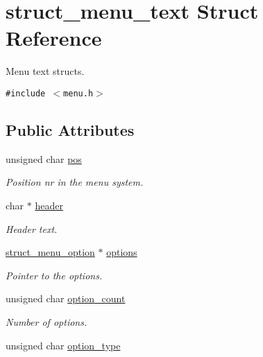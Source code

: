\hypertarget{structstruct__menu__text}{
\section{struct\_\-menu\_\-text Struct Reference}
\label{structstruct__menu__text}
}
Menu text structs.  


{\tt \#include $<$menu.h$>$}

\subsection*{Public Attributes}
\begin{CompactItemize}
\item 
\hypertarget{structstruct__menu__text_3cb34433f86c24879ebdd1bbca6b3fea}{
unsigned char \hyperlink{structstruct__menu__text_3cb34433f86c24879ebdd1bbca6b3fea}{pos}}
\label{structstruct__menu__text_3cb34433f86c24879ebdd1bbca6b3fea}

\begin{CompactList}\small\item\em Position nr in the menu system. \item\end{CompactList}\item 
\hypertarget{structstruct__menu__text_2549ae2c2c76f3d6eb501f5e5532a338}{
char $\ast$ \hyperlink{structstruct__menu__text_2549ae2c2c76f3d6eb501f5e5532a338}{header}}
\label{structstruct__menu__text_2549ae2c2c76f3d6eb501f5e5532a338}

\begin{CompactList}\small\item\em Header text. \item\end{CompactList}\item 
\hypertarget{structstruct__menu__text_ac076303968b95574448bccf38b81152}{
\hyperlink{structstruct__menu__option}{struct\_\-menu\_\-option} $\ast$ \hyperlink{structstruct__menu__text_ac076303968b95574448bccf38b81152}{options}}
\label{structstruct__menu__text_ac076303968b95574448bccf38b81152}

\begin{CompactList}\small\item\em Pointer to the options. \item\end{CompactList}\item 
\hypertarget{structstruct__menu__text_6f3c3ed68d2f7dac22ce0d03d0ca768c}{
unsigned char \hyperlink{structstruct__menu__text_6f3c3ed68d2f7dac22ce0d03d0ca768c}{option\_\-count}}
\label{structstruct__menu__text_6f3c3ed68d2f7dac22ce0d03d0ca768c}

\begin{CompactList}\small\item\em Number of options. \item\end{CompactList}\item 
unsigned char \hyperlink{structstruct__menu__text_a94d1bfe259ef142214b361cbe0ccd7c}{option\_\-type}
\end{CompactItemize}


